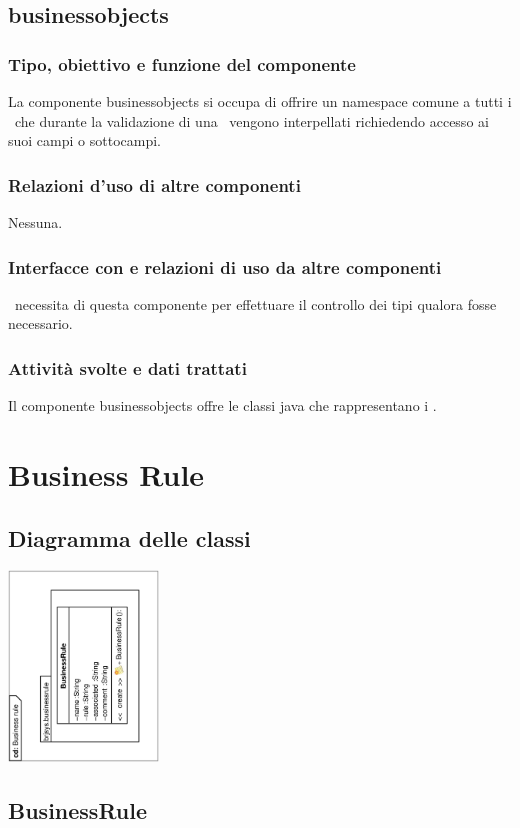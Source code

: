 \documentclass[11pt,titlepage,a4paper]{report}
\begin{document}
\subsection{businessobjects}%
\subsubsection{Tipo, obiettivo e funzione del componente}
La componente businessobjects si occupa di offrire un namespace comune a tutti i \bos\ che durante la validazione di una \br\ vengono interpellati richiedendo accesso ai suoi campi o sottocampi.
\subsubsection{Relazioni d'uso di altre componenti}
Nessuna.
\subsubsection{Interfacce con e relazioni di uso da altre componenti}
\brp\ necessita di questa componente per effettuare il controllo dei tipi qualora fosse necessario.
\subsubsection{Attivit\`a svolte e dati trattati}
Il componente businessobjects offre le classi java che rappresentano i \bos.

\section{Business Rule}
\subsection{Diagramma delle classi}
\begin{center}
\includegraphics[width=0.3\textwidth, angle=-90]{DiagrammaClassi/Businessrule.eps}
\end{center}
\subsection{BusinessRule}
\end{document}
